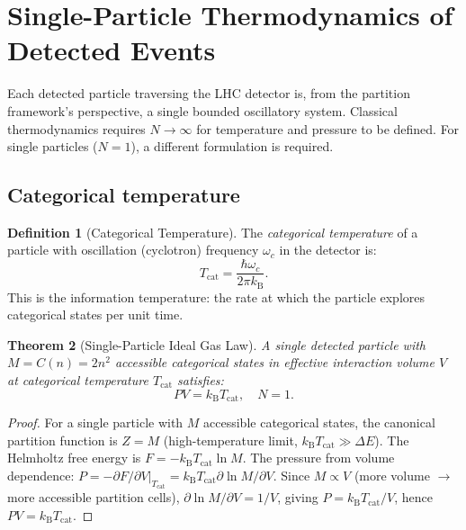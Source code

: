 \documentclass[twocolumn,10pt,a4paper]{article}
\theoremstyle{thmstyle}
\newtheorem{theorem}{Theorem}[section]
\theoremstyle{definition}
\newtheorem{definition}[theorem]{Definition}
\theoremstyle{remark}
\newcommand{\kB}{k_{\mathrm{B}}}
\begin{document}
\section{Single-Particle Thermodynamics of Detected Events}
\label{sec:thermodynamics}

Each detected particle traversing the LHC detector is, from the partition
framework's perspective, a single bounded oscillatory system. Classical
thermodynamics requires $N \to \infty$ for temperature and pressure to be
defined. For single particles ($N = 1$), a different formulation is required.

\subsection{Categorical temperature}

\begin{definition}[Categorical Temperature]
\label{def:Tcat}
The \emph{categorical temperature} of a particle with oscillation (cyclotron)
frequency $\omega_c$ in the detector is:
\begin{equation}
T_{\mathrm{cat}} = \frac{\hbar\omega_c}{2\pi\kB}.
\label{eq:Tcat}
\end{equation}
This is the information temperature: the rate at which the particle explores
categorical states per unit time.
\end{definition}

\begin{theorem}[Single-Particle Ideal Gas Law]
\label{thm:thermal}
A single detected particle with $M = C(n) = 2n^2$ accessible categorical
states in effective interaction volume $V$ at categorical temperature
$T_{\mathrm{cat}}$ satisfies:
\begin{equation}
PV = \kB T_{\mathrm{cat}}, \quad N = 1.
\label{eq:single_gas}
\end{equation}
\end{theorem}

\begin{proof}
For a single particle with $M$ accessible categorical states, the canonical
partition function is $Z = M$ (high-temperature limit, $\kB T_{\mathrm{cat}}
\gg \Delta E$). The Helmholtz free energy is $F = -\kB T_{\mathrm{cat}} \ln M$.
The pressure from volume dependence:
$P = -\partial F/\partial V|_{T_{\mathrm{cat}}} = \kB T_{\mathrm{cat}} \partial\ln M/\partial V$.
Since $M \propto V$ (more volume $\to$ more accessible partition cells),
$\partial\ln M/\partial V = 1/V$, giving $P = \kB T_{\mathrm{cat}}/V$,
hence $PV = \kB T_{\mathrm{cat}}$.
\end{proof}
\end{document}
